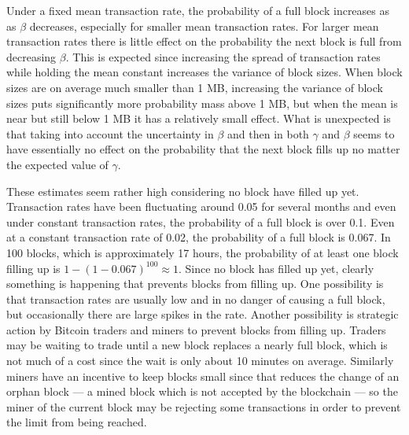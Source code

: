 \documentclass{article}
\begin{document}
Under a fixed mean transaction rate, the probability of a full block increases as as $\beta$ decreases, especially for smaller mean transaction rates. For larger mean transaction rates there is little effect on the probability the next block is full from decreasing $\beta$. This is expected since increasing the spread of transaction rates while holding the mean constant increases the variance of block sizes. When block sizes are on average much smaller than 1 MB, increasing the variance of block sizes puts significantly more probability mass above 1 MB, but when the mean is near but still below 1 MB it has a relatively small effect. What is unexpected is that taking into account the uncertainty in $\beta$ and then in both $\gamma$ and $\beta$ seems to have essentially no effect on the probability that the next block fills up no matter the expected value of $\gamma$.

These estimates seem rather high considering no block have filled up yet. Transaction rates have been fluctuating around 0.05 for several months and even under constant transaction rates, the probability of a full block is over 0.1. Even at a constant transaction rate of 0.02, the probability of a full block is 0.067. In 100 blocks, which is approximately 17 hours, the probability of at least one block filling up is $1-(1-0.067)^{100}\approx 1$. Since no block has filled up yet, clearly something is happening that prevents blocks from filling up. One possibility is that transaction rates are usually low and in no danger of causing a full block, but occasionally there are large spikes in the rate. Another possibility is strategic action by Bitcoin traders and miners to prevent blocks from filling up. Traders may be waiting to trade until a new block replaces a nearly full block, which is not much of a cost since the wait is only about 10 minutes on average. Similarly miners have an incentive to keep blocks small since that reduces the change of an orphan block --- a mined block which is not accepted by the blockchain --- so the miner of the current block may be rejecting some transactions in order to prevent the limit from being reached.

 

\end{document}
